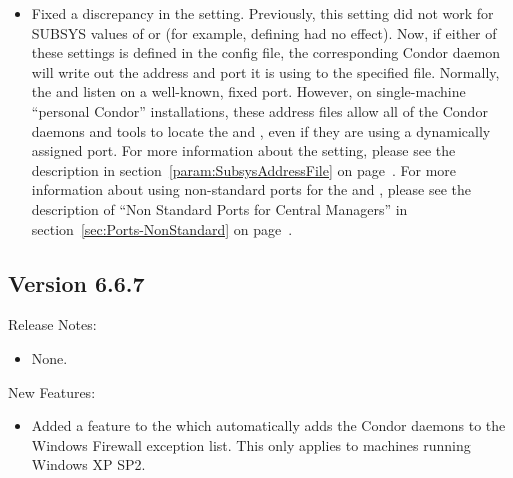 \begin{itemize}

\item Fixed a discrepancy in the 
  setting.
  Previously, this setting did not work for SUBSYS values of
  \verb@COLLECTOR@ or \verb@NEGOTIATOR@ (for example, defining
   had no effect).
  Now, if either of these settings is defined in the config file, the
  corresponding Condor daemon will write out the address and port it
  is using to the specified file.
  Normally, the  and  listen on a
  well-known, fixed port.
  However, on single-machine ``personal Condor'' installations, these
  address files allow all of the Condor daemons and tools to locate
  the  and , even if they are
  using a dynamically assigned port.
  For more information about the 
  setting, please see the description in
  section~\ref{param:SubsysAddressFile} on
  page~\pageref{param:SubsysAddressFile}.
  For more information about using non-standard ports for the
   and , please see the
  description of ``Non Standard Ports for Central Managers'' in
  section~\ref{sec:Ports-NonStandard} on
  page~\pageref{sec:Ports-NonStandard}.

\end{itemize}



\subsection{\label{sec:New-6-6-7}Version 6.6.7}

\noindent Release Notes:

\begin{itemize}

\item None.

\end{itemize}

\noindent New Features:

\begin{itemize}

\item Added a feature to the  which automatically adds
the Condor daemons to the Windows Firewall exception list. This only
applies to machines running Windows XP SP2.

\end{itemize}

